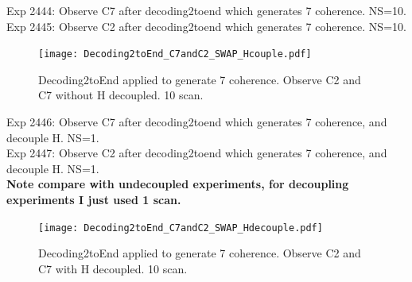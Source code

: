 \clearpage
Exp 2444: Observe C7 after decoding2toend which generates 7 coherence. NS=10.\\
Exp 2445: Observe C2 after decoding2toend which generates 7 coherence. NS=10.\\

\begin{figure}[htb]
\begin{center}
\texttt{[image: Decoding2toEnd\_C7andC2\_SWAP\_Hcouple.pdf]}
\end{center}
\setlength{\abovecaptionskip}{-0.35cm}
\caption{\footnotesize{Decoding2toEnd applied to generate 7 coherence. Observe C2 and C7 without H decoupled. 10 scan.}}\label{2444and2445}
\end{figure}

\clearpage
Exp 2446: Observe C7 after decoding2toend which generates 7 coherence, and decouple H. NS=1.\\
Exp 2447: Observe C2 after decoding2toend which generates 7 coherence, and decouple H. NS=1.\\
\textbf{Note compare with undecoupled experiments, for decoupling experiments I just used 1 scan.}

\begin{figure}[htb]
\begin{center}
\texttt{[image: Decoding2toEnd\_C7andC2\_SWAP\_Hdecouple.pdf]}
\end{center}
\setlength{\abovecaptionskip}{-0.35cm}
\caption{\footnotesize{Decoding2toEnd applied to generate 7 coherence. Observe C2 and C7 with H decoupled. 10 scan.}}\label{2446and2447}
\end{figure}